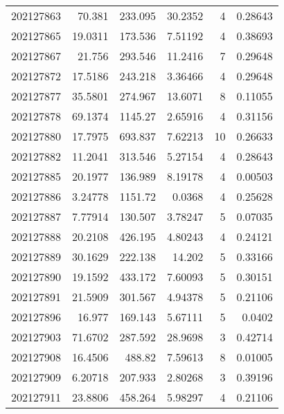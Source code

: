 \begin{tabular}{rrrrrr}
 202127863 &         70.381   &      233.095  &           30.2352  &           4 & 0.28643 \\
 202127865 &         19.0311  &      173.536  &            7.51192 &           4 & 0.38693 \\
 202127867 &         21.756   &      293.546  &           11.2416  &           7 & 0.29648 \\
 202127872 &         17.5186  &      243.218  &            3.36466 &           4 & 0.29648 \\
 202127877 &         35.5801  &      274.967  &           13.6071  &           8 & 0.11055 \\
 202127878 &         69.1374  &     1145.27   &            2.65916 &           4 & 0.31156 \\
 202127880 &         17.7975  &      693.837  &            7.62213 &          10 & 0.26633 \\
 202127882 &         11.2041  &      313.546  &            5.27154 &           4 & 0.28643 \\
 202127885 &         20.1977  &      136.989  &            8.19178 &           4 & 0.00503 \\
 202127886 &          3.24778 &     1151.72   &            0.0368  &           4 & 0.25628 \\
 202127887 &          7.77914 &      130.507  &            3.78247 &           5 & 0.07035 \\
 202127888 &         20.2108  &      426.195  &            4.80243 &           4 & 0.24121 \\
 202127889 &         30.1629  &      222.138  &           14.202   &           5 & 0.33166 \\
 202127890 &         19.1592  &      433.172  &            7.60093 &           5 & 0.30151 \\
 202127891 &         21.5909  &      301.567  &            4.94378 &           5 & 0.21106 \\
 202127896 &         16.977   &      169.143  &            5.67111 &           5 & 0.0402  \\
 202127903 &         71.6702  &      287.592  &           28.9698  &           3 & 0.42714 \\
 202127908 &         16.4506  &      488.82   &            7.59613 &           8 & 0.01005 \\
 202127909 &          6.20718 &      207.933  &            2.80268 &           3 & 0.39196 \\
 202127911 &         23.8806  &      458.264  &            5.98297 &           4 & 0.21106 \\

\end{tabular}
